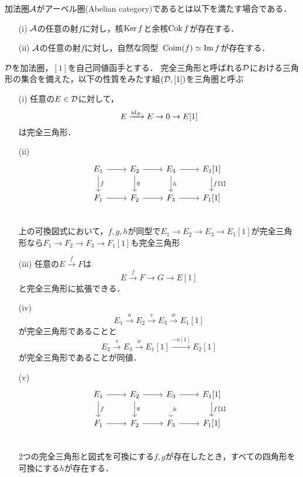 \begin{defn}
	加法圏${\mathcal A}$がアーベル圏(Abelian category)であるとは以下を満たす場合である．
	\vspace{-3mm}
	\begin{itemize}
		\item[(i)]
			${\mathcal A}$の任意の射$f$に対し，核$\operatorname{Ker} f$と余核$\operatorname{Cok} f$が存在する．
		\item[(ii)]
			${\mathcal A}$の任意の射$f$に対し，自然な同型\ $\mathrm{Coim}(f)\simeq\Im f$が存在する．
	\end{itemize}
\end{defn}

\begin{defn}
	${\mathcal D}$を加法圏，$[1]$を自己同値函手とする．
	完全三角形と呼ばれる${\mathcal D}$における三角形の集合を備えた，以下の性質をみたす組$({\mathcal D},[1])$を三角圏と呼ぶ$$$$
	\vspace{-3mm}
	\begin{itemize}
		\item[(i)]
			任意の$E\in{\mathcal D}$に対して，
			\[E\xrightarrow{\mathrm{id}_E}E\rightarrow 0 \rightarrow E[1]\]
			は完全三角形．
		\item[(ii)]
			\[
		\begin{tikzcd}
			E_1\ar[r]\ar[d,"f"]& E_2\ar[r]\ar[d,"g"]& E_3\ar[r]\ar[d,"h"] & E_1[1]\ar[d,"f\texttt{[1]}"]\\
			F_1\ar[r]& F_2\ar[r]& F_3\ar[r] & F_1[1]\\
		\end{tikzcd}
			\]
			上の可換図式において，$f,g,h$が同型で$E_1\rightarrow E_2\rightarrow E_3 \rightarrow E_1[1]$が完全三角形なら$F_1\rightarrow F_2\rightarrow F_3 \rightarrow F_1[1]$も完全三角形
		\item[(iii)]
			任意の$E\xrightarrow{f}F$は
			\[E\xrightarrow{f} F\rightarrow G \rightarrow E[1]\]
		と完全三角形に拡張できる．
	\item[(iv)]
		\[
			E_1\xrightarrow{u} E_2\xrightarrow{v} E_3\xrightarrow{w}  E_1[1]
	\]
	が完全三角形であることと
	\[
		E_2\xrightarrow{v} E_3\xrightarrow{w} E_1[1]\xrightarrow{-u[1]}  E_2[1]
	\]
	が完全三角形であることが同値．
	\item[(v)]
		\[
		\begin{tikzcd}
			E_1\ar[r]\ar[d,"f"]& E_2\ar[r]\ar[d,"g"]& E_3\ar[r]\ar[d,"h",dotted] & E_1[1]\ar[d,"f\texttt{[1]}"]\\
			F_1\ar[r]& F_2\ar[r]& F_3\ar[r] & F_1[1]\\
		\end{tikzcd}
	\]
	2つの完全三角形と図式を可換にする$f,g$が存在したとき，すべての四角形を可換にする$h$が存在する．


\end{itemize}
\end{defn}
